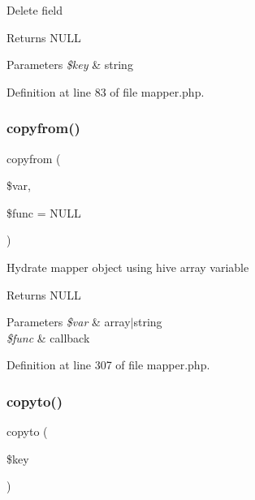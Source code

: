 Delete field \begin{DoxyReturn}{Returns}
N\+U\+LL 
\end{DoxyReturn}

\begin{DoxyParams}{Parameters}
{\em \$key} & string \\
\hline
\end{DoxyParams}


Definition at line 83 of file mapper.\+php.

\hypertarget{class_d_b_1_1_mongo_1_1_mapper_adffe904ab38af888d9b033647ec6d935}{}\label{class_d_b_1_1_mongo_1_1_mapper_adffe904ab38af888d9b033647ec6d935} 
\subsubsection{\texorpdfstring{copyfrom()}{copyfrom()}}
{\footnotesize\ttfamily copyfrom (\begin{DoxyParamCaption}\item[{}]{\$var,  }\item[{}]{\$func = {\ttfamily NULL} }\end{DoxyParamCaption})}

Hydrate mapper object using hive array variable \begin{DoxyReturn}{Returns}
N\+U\+LL 
\end{DoxyReturn}

\begin{DoxyParams}{Parameters}
{\em \$var} & array$\vert$string \\
\hline
{\em \$func} & callback \\
\hline
\end{DoxyParams}


Definition at line 307 of file mapper.\+php.

\hypertarget{class_d_b_1_1_mongo_1_1_mapper_a4bcf54f913758fb093c35ea81fc29615}{}\label{class_d_b_1_1_mongo_1_1_mapper_a4bcf54f913758fb093c35ea81fc29615} 
\subsubsection{\texorpdfstring{copyto()}{copyto()}}
{\footnotesize\ttfamily copyto (\begin{DoxyParamCaption}\item[{}]{\$key }\end{DoxyParamCaption})}

